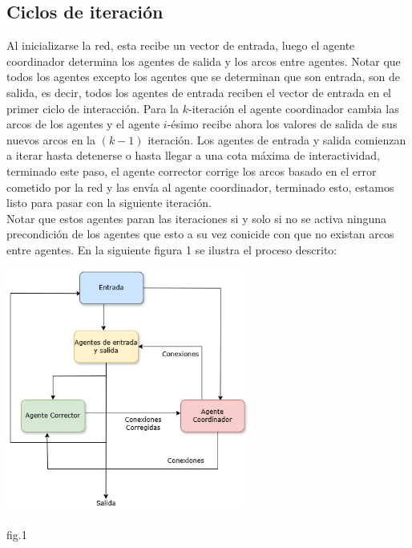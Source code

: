 \documentclass{article}
\begin{document}
        \subsection*{Ciclos de iteración}
        
         Al inicializarse la red, esta recibe un vector de entrada, luego el agente coordinador determina los agentes de salida y los arcos entre agentes. Notar que todos los agentes excepto los agentes que se determinan que son entrada, son de salida, es decir, todos los agentes de entrada reciben el vector de entrada en el primer ciclo de interacción. Para la $k$-iteración el agente coordinador cambia las arcos de los agentes y el agente $i$-ésimo recibe ahora los valores de salida de sus nuevos arcos en la $(k-1)$ iteración. Los agentes de entrada y salida comienzan a iterar hasta detenerse o hasta llegar a una cota máxima de interactividad, terminado este paso, el agente corrector corrige los arcos basado en el error cometido por la red y las envía al agente coordinador, terminado esto, estamos listo para pasar con la siguiente iteración. \\

        Notar que estos agentes paran las iteraciones si y solo si no se activa ninguna precondición de los agentes que esto a su vez conicide con que no existan arcos entre agentes. En la siguiente figura 1 se ilustra el proceso descrito: \\
        
        
        \begin{center}            
                \includegraphics[width=0.6\textwidth]{images/AgentArchitecture.drawio.png}
                \begin{center}
                    fig.1
                \end{center}                
        \end{center}   
    
\end{document}
